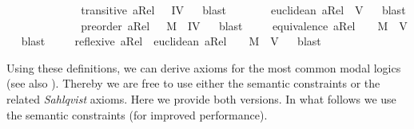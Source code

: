 \begin{isabellebody}
{\isafoldproof}%
%
\isadelimproof
%
\endisadelimproof
\ \ \ \ \ \ \ \ \ \isanewline
\ \ \isamarkupfalse%
\ {\isachardoublequoteopen}transitive\ aRel\ \ {\isasymLongrightarrow}\ {\isasymlfloor}IV{\isasymrfloor}{\isachardoublequoteclose}%
\isadelimproof
\ %
\endisadelimproof
%
\isatagproof
{}\isamarkupfalse%
\ blast%
\endisatagproof
{\isafoldproof}%
%
\isadelimproof
%
\endisadelimproof
\ \ \ \isanewline
\ \ \isamarkupfalse%
\ {\isachardoublequoteopen}euclidean\ aRel\ {\isasymLongrightarrow}\ {\isasymlfloor}V{\isasymrfloor}{\isachardoublequoteclose}%
\isadelimproof
\ %
\endisadelimproof
%
\isatagproof
{}\isamarkupfalse%
\ blast%
\endisatagproof
{\isafoldproof}%
%
\isadelimproof
%
\endisadelimproof
\ \ \ \ \ \ \ \ \ \isanewline
\ \ \isamarkupfalse%
\ {\isachardoublequoteopen}preorder\ aRel\ {\isasymLongrightarrow}\ \ {\isasymlfloor}M{\isasymrfloor}\ {\isasymand}\ {\isasymlfloor}IV{\isasymrfloor}{\isachardoublequoteclose}%
\isadelimproof
\ %
\endisadelimproof
%
\isatagproof
{}\isamarkupfalse%
\ blast\ %
%
\endisatagproof
{\isafoldproof}%
%
\isadelimproof
%
\endisadelimproof
\isanewline
\ \ \isamarkupfalse%
\ {\isachardoublequoteopen}equivalence\ aRel\ \ {\isasymLongrightarrow}\ \ {\isasymlfloor}M{\isasymrfloor}\ {\isasymand}\ {\isasymlfloor}V{\isasymrfloor}{\isachardoublequoteclose}%
\isadelimproof
\ %
\endisadelimproof
%
\isatagproof
{}\isamarkupfalse%
\ blast\ %
%
\endisatagproof
{\isafoldproof}%
%
\isadelimproof
%
\endisadelimproof
\isanewline
\ \ \isamarkupfalse%
\ {\isachardoublequoteopen}reflexive\ aRel\ {\isasymand}\ euclidean\ aRel\ \ {\isasymLongrightarrow}\ \ {\isasymlfloor}M{\isasymrfloor}\ {\isasymand}\ {\isasymlfloor}V{\isasymrfloor}{\isachardoublequoteclose}%
\isadelimproof
\ %
\endisadelimproof
%
\isatagproof
{}\isamarkupfalse%
\ blast\ %
%
\endisatagproof
{\isafoldproof}%
%
\isadelimproof
%
\endisadelimproof
%
\begin{isamarkuptext}%
Using these definitions, we can derive axioms for the most common modal logics (see also \cite{C47}). 
  Thereby we are free to use either the semantic constraints or the related \emph{Sahlqvist} axioms. Here we provide 
  both versions. In what follows we use the semantic constraints (for improved performance).
  \pagebreak%
\end{isamarkuptext}\isamarkuptrue%
%
\isadelimtheory
%
\endisadelimtheory
%
\isatagtheory
%
\endisatagtheory
{\isafoldtheory}%
%
\isadelimtheory
%
\endisadelimtheory
%
\end{isabellebody}%
